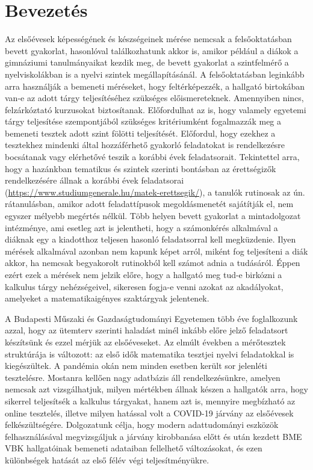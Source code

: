 \documentclass[12pt]{article}
\begin{document}
\tableofcontents
\newpage


\section{Bevezetés}
Az elsőévesek képességének és készségeinek mérése nemcsak a felsőoktatásban bevett gyakorlat, hasonlóval találkozhatunk akkor is, amikor például a diákok a gimnáziumi tanulmányaikat kezdik meg, de bevett gyakorlat a szintfelmérő a nyelviskolákban is a nyelvi szintek megállapításánál. A felsőoktatásban leginkább arra használják a bemeneti méréseket, hogy feltérképezzék, a hallgató birtokában van-e az adott tárgy teljesítéséhez szükséges előismereteknek. Amennyiben nincs, felzárkóztató kurzusokat biztosítanak. Előfordulhat az is, hogy valamely egyetemi tárgy teljesítése szempontjából szükséges kritériumként fogalmazzák meg a bemeneti tesztek adott szint fölötti teljesítését. Előfordul, hogy ezekhez a tesztekhez mindenki által hozzáférhető gyakorló feladatokat is rendelkezésre bocsátanak vagy elérhetővé teszik a korábbi évek feladatsorait. Tekintettel arra, hogy a hazánkban tematikus és szintek szerinti bontásban az érettségizők rendelkezésére állnak a korábbi évek feladatsorai (\url{https://www.studiumgenerale.hu/matek-erettsegik/}), a tanulók rutinosak az ún. rátanulásban, amikor adott feladattípusok megoldásmenetét sajátítják el, nem egyszer mélyebb megértés nélkül. Több helyen bevett gyakorlat a mintadolgozat intézménye, ami esetleg azt is jelentheti, hogy a számonkérés alkalmával a diáknak egy a kiadotthoz teljesen hasonló feladatsorral kell megküzdenie. Ilyen mérések alkalmával azonban nem kapunk képet arról, miként fog teljesíteni a diák akkor, ha nemcsak begyakorolt rutinokból kell számot adnia a tudásáról. Éppen ezért ezek a mérések nem jelzik előre, hogy a hallgató meg tud-e birkózni a kalkulus tárgy nehézségeivel, sikeresen fogja-e venni azokat az akadályokat, amelyeket a matematikaigényes szaktárgyak jelentenek.

A Budapesti Műszaki és Gazdaságtudományi Egyetemen több éve foglalkozunk azzal, hogy az ütemterv szerinti haladást minél inkább előre jelző feladatsort készítsünk és ezzel mérjük az elsőéveseket. Az elmúlt években a mérőtesztek struktúrája is változott: az első idők matematika tesztjei nyelvi feladatokkal is kiegészültek. A pandémia okán nem minden esetben került sor jelenléti tesztelésre. Mostanra kellően nagy adatbázis áll rendelkezésünkre, amelyen nemcsak azt vizsgálhatjuk, milyen mértékben állnak készen a hallgatók arra, hogy sikerrel teljesítsék a kalkulus tárgyakat, hanem azt is, mennyire megbízható az online tesztelés, illetve milyen hatással volt a COVID-19 járvány az elsőévesek felkészültségére. Dolgozatunk célja, hogy modern adattudományi eszközök felhasználásával megvizsgáljuk a járvány kirobbanása előtt és után kezdett BME VBK hallgatóinak bemeneti adataiban fellelhető változásokat, és ezen különbségek hatását az első félév végi teljesítményükre.
\end{document}
